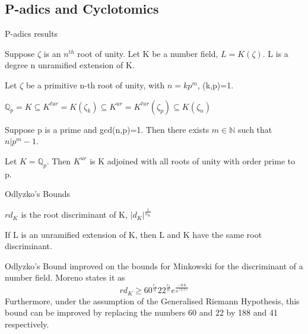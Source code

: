 \documentclass[10pt]{beamer}
\theoremstyle{plain} %
\begin{document}
\subsection{P-adics and Cyclotomics}
\begin{frame}{P-adics results}

\begin{theorem}
   Suppose $\zeta$ is an $n^{th}$ root of unity. Let K be a number field, $L=K(\zeta)$. 
L is a degree n unramified extension of K. 
\end{theorem}

Let $\zeta$ be a primitive n-th root of unity, with $n=kp^{m}$, (k,p)=1.
\begin{example}
      $\mathbb{Q}_{p}=K\subseteq K^{tur}=K(\zeta_k)\subseteq K^{ur} = K^{tur}(\zeta_{p})\subseteq K(\zeta_n)$
\end{example}
\begin{lemma}
Suppose p is a prime and gcd(n,p)=1. Then there exists $m\in\mathbb{N}$ such that $n|p^m-1$.
\end{lemma}
\begin{theorem}
    Let $K=\mathbb{Q}_p$. Then $K^{ur}$ is K adjoined with all roots of unity with order prime to p. 
\end{theorem}

\end{frame}
\begin{frame}{Odlyzko's Bounds}
\begin{definition}
$rd_K$ is the root discriminant of K, $|d_K|^\frac{1}{n_K}$
\end{definition}
\begin{lemma}
 If L is an unramified extension of K, then L and K have the same root discriminant.
\end{lemma}
    Odlyzko's Bound improved on the bounds for Minkowski for the discriminant of a number field. Moreno states it as  
\begin{equation}
rd_K\geqslant 60^{\frac{r_1}{n}}22^{\frac{r_2}{n}}e^\frac{-8.6}{n^(2/3)}\end{equation}
Furthermore, under the assumption of the Generalised Riemann Hypothesis, 
this bound can be improved by replacing the numbers 60 and 22 by 188 and 41 respectively. 
\end{frame}
\end{document}
